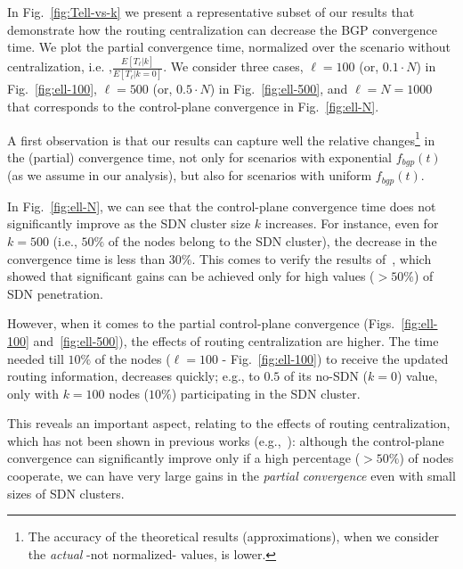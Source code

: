 In Fig.~\ref{fig:Tell-vs-k} we present a representative subset of our results that demonstrate how the routing centralization can decrease the BGP convergence time. We plot the partial convergence time, normalized over the scenario without centralization, i.e. ,$\frac{E[T_{\ell}|k]}{E[T_{\ell}|k=0]}$. We consider three cases, $\ell=100$ (or, $0.1\cdot N$) in Fig.~\ref{fig:ell-100}, $\ell=500$ (or, $0.5\cdot N$) in Fig.~\ref{fig:ell-500}, and $\ell=N=1000$ that corresponds to the control-plane convergence in Fig.~\ref{fig:ell-N}. 

A first observation is that our results can capture well the relative changes\footnote{The accuracy of the theoretical results (approximations), when we consider the \textit{actual} -not normalized- values, is lower.} in the (partial) convergence time, not only for scenarios with exponential $f_{bgp}(t)$ (as we assume in our analysis), but also for scenarios with uniform $f_{bgp}(t)$.

In Fig.~\ref{fig:ell-N}, we can see that the control-plane convergence time does not significantly improve as the SDN cluster size $k$ increases. For instance, even for $k=500$ (i.e., $50\%$ of the nodes belong to the SDN cluster), the decrease in the convergence time is less than $30\%$. This comes to verify the results of~\cite{Kotronis-Routing-Centralization-ComNets-2015}, which showed that significant gains can be achieved only for high values ($>50\%$) of SDN penetration.

However, when it comes to the partial control-plane convergence (Figs.~\ref{fig:ell-100} and~\ref{fig:ell-500}), the effects of routing centralization are higher. The time needed till $10\%$  of the nodes ($\ell=100$ - Fig.~\ref{fig:ell-100}) to receive the updated routing information, decreases quickly; e.g., to $0.5$ of its no-SDN ($k=0$) value, only with $k=100$ nodes ($10\%$) participating in the SDN cluster. 

This reveals an important aspect, relating to the effects of routing centralization, which has not been shown in previous works (e.g.,~\cite{Kotronis-Routing-Centralization-ComNets-2015}): although the control-plane convergence can significantly improve only if a high percentage ($>50\%$) of nodes cooperate, we can have very large gains in the \textit{partial convergence} even with small sizes of SDN clusters.


